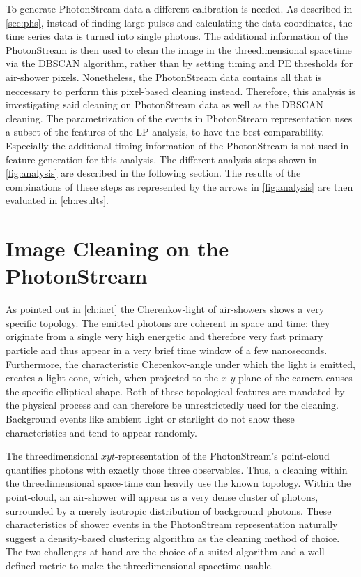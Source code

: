 %
To generate PhotonStream data a different calibration is needed. As described
in \autoref{sec:phs}, instead of finding large pulses and calculating the data
coordinates, the time series data is turned into single photons. The additional
information of the PhotonStream is then used to clean the image in the
threedimensional spacetime via the DBSCAN algorithm, rather than by setting
timing and PE thresholds for air-shower pixels. Nonetheless, the PhotonStream
data contains all that is neccessary to perform this pixel-based cleaning
instead. Therefore, this analysis is investigating said cleaning on
PhotonStream data as well as the DBSCAN cleaning. The parametrization of the
events in PhotonStream representation uses a subset of the features of the LP
analysis, to have the best comparability. Especially the additional timing
information of the PhotonStream is not used in feature generation for this
analysis. The different analysis steps shown in \autoref{fig:analysis} are
described in the following section. The results of the combinations of these
steps as represented by the arrows in \autoref{fig:analysis} are then evaluated
in \autoref{ch:results}.

\section{Image Cleaning on the PhotonStream}\label{sec:phs_clean}
%
As pointed out in \autoref{ch:iact} the Cherenkov-light of air-showers shows a
very specific topology. The emitted photons are coherent in space and time:
they originate from a single very high energetic and therefore very fast
primary particle and thus appear in a very brief time window of a few
nanoseconds. Furthermore, the characteristic Cherenkov-angle under which the
light is emitted, creates a light cone, which, when projected to the
$x$-$y$-plane of the camera causes the specific elliptical shape. Both of these
topological features are mandated by the physical process and can therefore be
unrestrictedly used for the cleaning. Background events like ambient light or
starlight do not show these characteristics and tend to appear randomly.

The threedimensional $xyt$-representation of the PhotonStream's point-cloud
quantifies photons with exactly those three observables. Thus, a cleaning
within the threedimensional space-time can heavily use the known topology.
Within the point-cloud, an air-shower will appear as a very dense cluster of
photons, surrounded by a merely isotropic distribution of background photons.
These characteristics of shower events in the PhotonStream representation
naturally suggest a density-based clustering algorithm as the cleaning method
of choice. The two challenges at hand are the choice of a suited algorithm and
a well defined metric to make the threedimensional spacetime usable.

